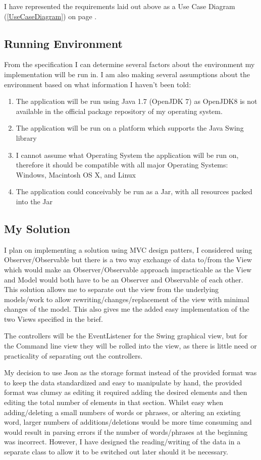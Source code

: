 \documentclass[a4paper, 11pt]{article}
\begin{document}
I have represented the requirements laid out above as a Use Case Diagram (\ref{UseCaseDiagram}) on page \pageref{UseCaseDiagram}.

\subsection{Running Environment}

From the specification I can determine several factors about the environment my implementation will be run in. I am also making several assumptions about the environment based on what information I haven't been told:

\begin{enumerate}
\item The application will be run using Java 1.7 (OpenJDK 7) as OpenJDK8 is not available in the official package repository of my operating system. 
\item The application will be run on a platform which supports the Java Swing library
\item I cannot assume what Operating System the application will be run on, therefore it should be compatible with all major Operating Systems: Windows, Macintosh OS X, and Linux
\item The application could conceivably be run as a Jar, with all resources packed into the Jar
\end{enumerate}

\subsection{My Solution}

I plan on implementing a solution using MVC design patters, I considered using Observer/Observable but there is a two way exchange of data to/from the View which would make an Observer/Observable approach impracticable as the View and Model would both have to be an Observer and Observable of each other. This solution allows me to separate out the view from the underlying models/work to allow rewriting/changes/replacement of the view with minimal changes of the model. This also gives me the added easy implementation of the two Views specified in the brief. 

The controllers will be the EventListener for the Swing graphical view, but for the Command line view they will be rolled into the view, as there is little need or practicality of separating out the controllers. 

My decision to use Json as the storage format instead of the provided format was to keep the data standardized and easy to manipulate by hand, the provided format was clumsy as editing it required adding the desired elements and then editing the total number of elements in that section. Whilst easy when adding/deleting a small numbers of words or phrases, or altering an existing word, larger numbers of additions/deletions would be more time consuming and would result in parsing errors if the number of words/phrases at the beginning was incorrect. However, I have designed the reading/writing of the data in a separate class to allow it to be switched out later should it be necessary. 
\end{document}
